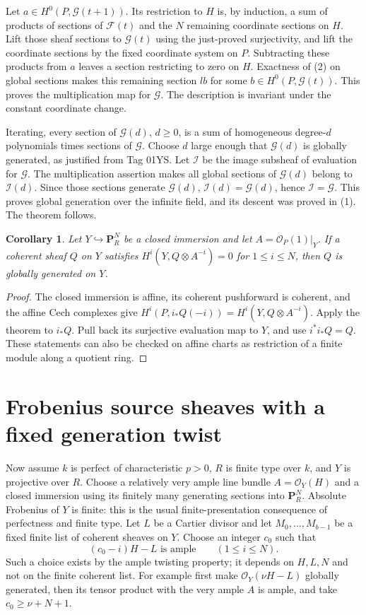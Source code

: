 \documentclass[11pt]{article}
\newtheorem{corollary}[theorem]{Corollary}
\newcommand{\OO}{\mathcal O}
\newcommand{\GG}{\mathcal G}
\newcommand{\FF}{\mathcal F}
\begin{document}
Let $a\in H^0(P,\GG(t+1))$. Its restriction to $H$ is, by induction,
a sum of products of sections of $\FF(t)$ and the $N$ remaining
coordinate sections on $H$. Lift those sheaf sections to $\GG(t)$
using the just-proved surjectivity, and lift the coordinate sections
by the fixed coordinate system on $P$. Subtracting these products
from $a$ leaves a section restricting to zero on $H$. Exactness of
(2) on global sections makes this remaining section $l b$ for some
$b\in H^0(P,\GG(t))$. This proves the multiplication map for $\GG$.
The description is invariant under the constant coordinate change.

Iterating, every section of $\GG(d)$, $d\geq0$, is a sum of homogeneous
degree-$d$ polynomials times sections of $\GG$. Choose $d$ large enough
that $\GG(d)$ is globally generated, as justified from Tag 01YS.
Let $\mathcal I$ be the image subsheaf of evaluation for $\GG$.
The multiplication assertion makes all global sections of $\GG(d)$
belong to $\mathcal I(d)$. Since those sections generate $\GG(d)$,
$\mathcal I(d)=\GG(d)$, hence $\mathcal I=\GG$. This proves global
generation over the infinite field, and its descent was proved in (1).
The theorem follows.

\begin{corollary}\label{cor:Y}
Let $Y\hookrightarrow\mathbf P^N_R$ be a closed immersion and let
$A=\OO_P(1)|_Y$. If a coherent sheaf $Q$ on $Y$ satisfies
$H^i(Y,Q\otimes A^{-i})=0$ for $1\leq i\leq N$, then $Q$ is globally
generated on $Y$.
\end{corollary}
\begin{proof}
The closed immersion is affine, its coherent pushforward is coherent,
and the affine Cech complexes give
$H^i(P,i_*Q(-i))=H^i(Y,Q\otimes A^{-i})$. Apply the theorem to $i_*Q$.
Pull back its surjective evaluation map to $Y$, and use
$i^*i_*Q=Q$. These statements can also be checked on affine charts
as restriction of a finite module along a quotient ring.
\end{proof}

\section{Frobenius source sheaves with a fixed generation twist}
Now assume $k$ is perfect of characteristic $p>0$, $R$ is finite type
over $k$, and $Y$ is projective over $R$. Choose a relatively very ample
line bundle $A=\OO_Y(H)$ and a closed immersion using its finitely
many generating sections into $\mathbf P^N_R$. Absolute Frobenius of
$Y$ is finite: this is the usual finite-presentation consequence of
perfectness and finite type. Let $L$ be a Cartier divisor and let
$M_0,\ldots,M_{b-1}$ be a fixed finite list of coherent sheaves on $Y$.
Choose an integer $c_0$ such that
\[
 (c_0-i)H-L\text{ is ample}\qquad(1\leq i\leq N).           \tag{3}
\]
Such a choice exists by the ample twisting property; it depends on
$H,L,N$ and not on the finite coherent list. For example first make
$\OO_Y(\nu H-L)$ globally generated, then its tensor product with
the very ample $A$ is ample, and take $c_0\geq\nu+N+1$.
\end{document}
